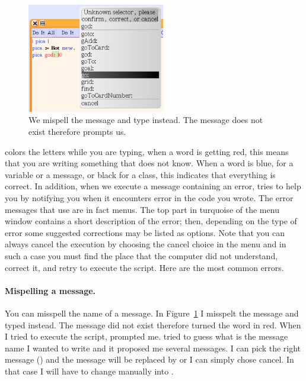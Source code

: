 \begin{figure}[ht!]
\begin{center}\includegraphics[width=6cm]{errorOne}
\caption{We mispell the message  and type  instead. The message  does not exist therefore \sq prompts us. \label{fig:unknowSelector}}\end{center}
\end{figure}

\sq colors the letters while you are typing, when a word is getting red, this means that you are writing something that \sq does not know. When a word is blue, for a variable or a message, or black for a class, this indicates that everything is correct. In addition, when we execute a message containing an error,  \sq tries to help you by notifying you when it encounters error in the code you wrote.  The error messages that \sq use are in fact menus. The top part in turquoise of the menu window contains a short description of the error; then, depending on the type of error some suggested corrections may be listed as options. Note that you can always cancel  the execution by choosing the cancel choice in the menu and in such a case you must find the place that the computer did not understand, correct it, and retry to execute the script. Here are the most common errors.






\paragraph{Mispelling a message.} You can misspell the name of a message.  In Figure~\ref{fig:unknowSelector} I misspelt the message  and typed  instead.  The message  did not exist therefore \sq turned the word in red. When I tried to execute the script, \sq prompted me. \sq tried to guess what is the message name I wanted to write and it proposed me several messages. I can pick the right message () and the message  will be replaced by  or I can simply chose cancel. In that case I will have to change manually  into .



